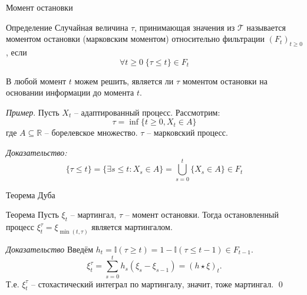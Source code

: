 \documentclass{beamer}
\begin{document}
\begin{frame}{Момент остановки}
    \begin{block}{Определение}
    Случайная величина $\tau$, принимающая значения из $\mathcal{T}$ называется моментом остановки (марковским моментом) относительно фильтрации $(F_t)_{t\geq 0}$, если 
    $$
        \forall t \geq 0 \; \{\tau \leq t\} \in F_t   
    $$
    \end{block}
    В любой момент $t$ можем решить, является ли $\tau$ моментом остановки на основании информации до момента $t$.
    \pause
    
    \textit{Пример}. Пусть $X_t$ -- адаптированный процесс. Рассмотрим:
    $$
        \tau = \inf\{t\geq 0, X_t \in A\}
    $$где $A\subseteq\mathbb{R}$ -- борелевское множество. $\tau$ -- марковский процесс.
    \pause
    
    \textit{Доказательство:}
    $$
        \{\tau \leq t\} = \{\exists s \leq t : X_s \in A\} = \bigcup_{s=0}^t \{ X_s \in A\} \in F_t
    $$
\end{frame}
\begin{frame}{Теорема Дуба}
    \begin{block}{Теорема}
        Пусть $\xi_t$ -- мартингал, $\tau$ -- момент остановки. Тогда остановленный процесс $\xi_t^{\tau} = \xi_{\min(t, \tau)}$ является мартингалом.
    \end{block}
    \pause
    \textit{Доказательство}
    Введём $h_t = \mathbb{I}(\tau \geq t) =1-\mathbb{I}(\tau \leq t-1) \in F_{t-1}$.
    $$
        \xi_t^{\tau} = \sum_{s=0}^{t} h_s (\xi_{s} - \xi_{s-1})
        = (h\star \xi)_t. 
    $$ Т.е. $\xi_t^{\tau}$ -- стохастический интеграл по мартингалу, значит, тоже мартингал. 
    \qed
\end{frame}
\end{document}
